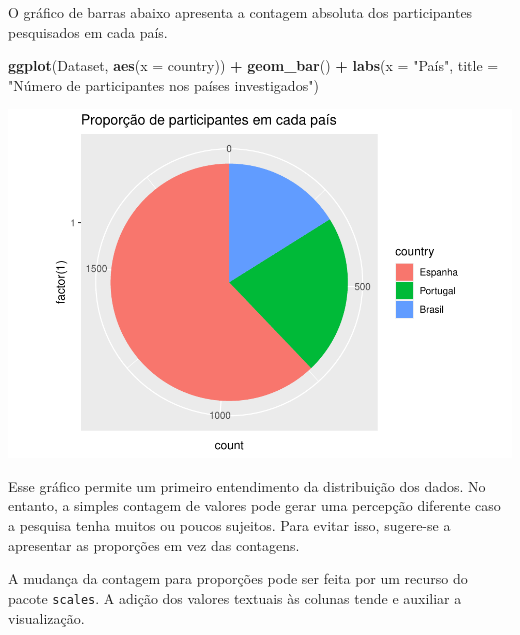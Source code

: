 \documentclass[
]{book}
\newenvironment{Shaded}{\begin{snugshade}}{\end{snugshade}}
\newcommand{\DataTypeTok}[1]{\textcolor[rgb]{0.13,0.29,0.53}{#1}}
\newcommand{\KeywordTok}[1]{\textcolor[rgb]{0.13,0.29,0.53}{\textbf{#1}}}
\newcommand{\NormalTok}[1]{#1}
\newcommand{\OperatorTok}[1]{\textcolor[rgb]{0.81,0.36,0.00}{\textbf{#1}}}
\newcommand{\StringTok}[1]{\textcolor[rgb]{0.31,0.60,0.02}{#1}}
\begin{document}
O gráfico de barras abaixo apresenta a contagem absoluta dos participantes pesquisados em cada país.

\begin{Shaded}
\begin{Highlighting}[]
\KeywordTok{ggplot}\NormalTok{(Dataset, }\KeywordTok{aes}\NormalTok{(}\DataTypeTok{x =}\NormalTok{ country)) }\OperatorTok{+}
\StringTok{  }\KeywordTok{geom_bar}\NormalTok{() }\OperatorTok{+}
\StringTok{  }\KeywordTok{labs}\NormalTok{(}\DataTypeTok{x =} \StringTok{"País"}\NormalTok{, }
       \DataTypeTok{title =} \StringTok{"Número de participantes nos países investigados"}\NormalTok{)}
\end{Highlighting}
\end{Shaded}

\begin{center}\includegraphics{gitbook-demo_files/figure-latex/unnamed-chunk-15-1} \end{center}

Esse gráfico permite um primeiro entendimento da distribuição dos dados. No entanto, a simples contagem de valores pode gerar uma percepção diferente caso a pesquisa tenha muitos ou poucos sujeitos. Para evitar isso, sugere-se a apresentar as proporções em vez das contagens.

A mudança da contagem para proporções pode ser feita por um recurso do pacote \texttt{scales}. A adição dos valores textuais às colunas tende e auxiliar a visualização.
\end{document}
